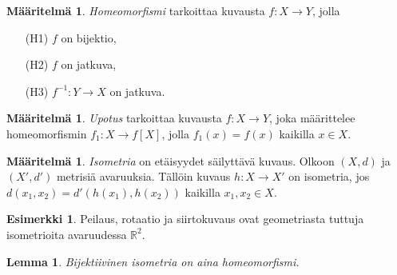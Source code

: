 \documentclass[12pt,a4paper,leqno]{report}
\newcommand{\R}{\mathbb{R}}
\theoremstyle{plain}
\newtheorem{lem}[equation]{Lemma}
\theoremstyle{definition}
\newtheorem{maar}[equation]{Määritelmä}
\newtheorem{esim}[equation]{Esimerkki}
\theoremstyle{remark}
\begin{document}
\begin{maar} \emph{Homeomorfismi} 
tarkoittaa kuvausta $f\colon X\rightarrow Y$, jolla 
\begin{itemize}
\item[(H1)] $f$ on bijektio,
\item[(H2)] $f$ on jatkuva,
\item[(H3)] $f^{-1} \colon Y\rightarrow X$ on jatkuva. 
\end{itemize}
\end{maar}

\begin{maar}\emph{Upotus} 
tarkoittaa kuvausta $f\colon X\rightarrow Y$, joka määrittelee homeomorfismin $f_1\colon X\rightarrow f[X]$, jolla $f_1(x)=f(x)$ kaikilla $x\in X$. %
\end{maar}
\begin{maar}\emph{Isometria}
 on etäisyydet säilyttävä kuvaus. Olkoon $(X,d)$ ja $(X',d')$ metrisiä avaruuksia. %
Tällöin kuvaus $h\colon X\rightarrow X'$ on isometria, jos $d(x_1,x_2)=d'(h(x_1),h(x_2))$ kaikilla $x_1,x_2 \in X$.
\end{maar}
%
\begin{esim}
Peilaus, rotaatio ja siirtokuvaus ovat geometriasta tuttuja isometrioita avaruudessa $\R^2$.
\end{esim}
\begin{lem}\label{isolemma} Bijektiivinen isometria on aina homeomorfismi.
\end{lem}
\end{document}
